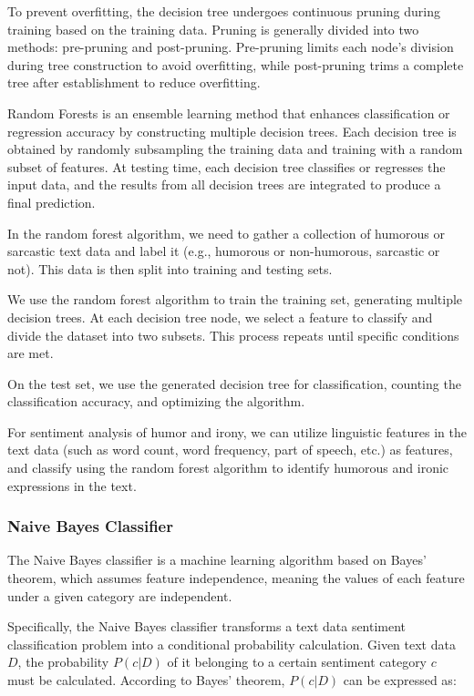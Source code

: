\documentclass[a4paper]{article}
\begin{document}
To prevent overfitting, the decision tree undergoes continuous pruning during training based on the training data. Pruning is generally divided into two methods: pre-pruning and post-pruning. Pre-pruning limits each node's division during tree construction to avoid overfitting, while post-pruning trims a complete tree after establishment to reduce overfitting.

Random Forests is an ensemble learning method that enhances classification or regression accuracy by constructing multiple decision trees. Each decision tree is obtained by randomly subsampling the training data and training with a random subset of features. At testing time, each decision tree classifies or regresses the input data, and the results from all decision trees are integrated to produce a final prediction.

In the random forest algorithm, we need to gather a collection of humorous or sarcastic text data and label it (e.g., humorous or non-humorous, sarcastic or not). This data is then split into training and testing sets.

We use the random forest algorithm to train the training set, generating multiple decision trees. At each decision tree node, we select a feature to classify and divide the dataset into two subsets. This process repeats until specific conditions are met.

On the test set, we use the generated decision tree for classification, counting the classification accuracy, and optimizing the algorithm.

For sentiment analysis of humor and irony, we can utilize linguistic features in the text data (such as word count, word frequency, part of speech, etc.) as features, and classify using the random forest algorithm to identify humorous and ironic expressions in the text.

\subsubsection{Naive Bayes Classifier}

The Naive Bayes classifier is a machine learning algorithm based on Bayes' theorem, which assumes feature independence, meaning the values of each feature under a given category are independent.

Specifically, the Naive Bayes classifier transforms a text data sentiment classification problem into a conditional probability calculation. Given text data $D$, the probability $P(c|D)$ of it belonging to a certain sentiment category $c$ must be calculated. According to Bayes' theorem, $P(c|D)$ can be expressed as:
\end{document}
